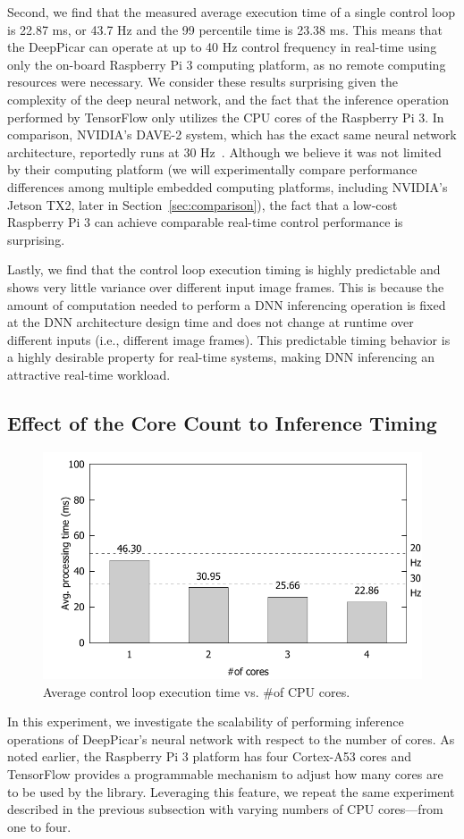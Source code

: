 Second, we find that the measured average
execution time of a single control loop is 22.87 ms, or 43.7 Hz and
the 99 percentile time is 23.38 ms.
This means that the DeepPicar can operate
at up to 40 Hz control frequency in real-time using only the on-board
Raspberry Pi 3 computing platform, as no remote computing resources 
were necessary. We consider these results surprising given the complexity
of the deep neural network, and the fact that the inference operation
performed by TensorFlow only utilizes the CPU cores of the Raspberry Pi 3.
In comparison, NVIDIA's DAVE-2 system, which has the exact same neural
network architecture, reportedly runs at 30 Hz~\cite{Bojarski2016}. 
Although we believe it was not
limited by their computing platform (we will experimentally compare
performance differences among multiple embedded computing platforms,
including NVIDIA's Jetson TX2, later in
Section~\ref{sec:comparison}), the fact that a low-cost
Raspberry Pi 3 can achieve comparable real-time control performance is
surprising.

Lastly, we find that the control loop execution timing is highly
predictable and shows very little variance over different input image
frames. This is because the amount of computation needed to perform
a DNN inferencing operation is fixed at the DNN architecture design
time and does not change at runtime over different inputs (i.e.,
different image frames). This predictable timing behavior is a highly
desirable property for real-time systems, making DNN inferencing an
attractive real-time workload.

\subsection{Effect of the Core Count to Inference Timing}

\begin{figure}[h]
  \centering
  \includegraphics[width=.45\textwidth]{figs/perf_vs_corecnt}
  \caption{Average control loop execution time vs. \#of CPU
    cores.}
  \label{fig:perf-vs-corecnt}
\end{figure}

In this experiment, we investigate the scalability of performing
inference operations of DeepPicar's neural network with respect to the
number of cores. As noted earlier, the Raspberry Pi 3 platform has
four Cortex-A53 cores and TensorFlow 
provides a programmable mechanism to adjust how many cores are to be
used by the library. Leveraging this feature, we repeat the
same experiment described in the previous subsection with varying
numbers of CPU cores---from one to four.

